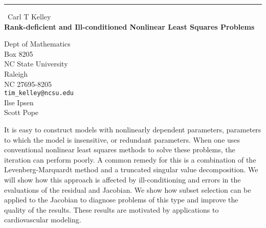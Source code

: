 \documentclass{report}
\begin{document}
\begin{center}
\rule{6in}{1pt} \
{\large Carl T Kelley \\
{\bf Rank-deficient and Ill-conditioned Nonlinear Least Squares Problems}}

Dept of Mathematics \\ Box 8205 \\ NC State University \\ Raleigh \\ NC 27695-8205
\\
{\tt tim\_kelley@ncsu.edu}\\
Ilse Ipsen\\
Scott Pope\end{center}

It is easy to construct models with nonlinearly dependent parameters,
parameters to which the model is insensitive, or redundant parameters.
When one uses conventional nonlinear least squares methods to solve
these problems, the iteration can perform poorly. A common remedy for
this is a combination of the Levenberg-Marquardt method and a truncated
singular value decomposition. We will show how this approach is
affected by ill-conditioning and errors in the evaluations of
the residual and Jacobian. We show how subset selection
can be applied to the Jacobian to diagnose problems of this type
and improve the quality of the results. These results are motivated by
applications to cardiovascular modeling.
\end{document}
